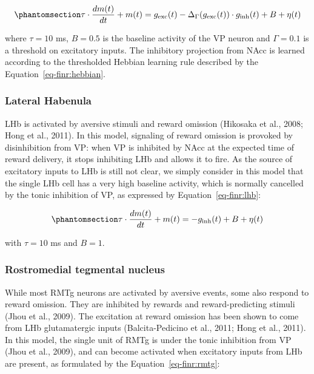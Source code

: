 \documentclass[
  11pt,
  a4paper,
]{scrbook}
\begin{document}
\begin{equation}\phantomsection\label{eq-finr:vp}{
    \tau \cdot \frac{dm(t)}{dt} +  m(t) = g_{\text{exc}}(t) - \Delta_{\Gamma} (g_{\text{exc}}(t)) \cdot g_{\text{inh}}(t) + B + \eta(t)
}\end{equation}

where \(\tau=10\) ms, \(B=0.5\) is the baseline activity of the VP
neuron and \(\Gamma=0.1\) is a threshold on excitatory inputs. The
inhibitory projection from NAcc is learned according to the thresholded
Hebbian learning rule described by the Equation~\ref{eq-finr:hebbian}.

\subsubsection*{Lateral Habenula}\label{lateral-habenula}

LHb is activated by aversive stimuli and reward omission (Hikosaka et
al., 2008; Hong et al., 2011). In this model, signaling of reward
omission is provoked by disinhibition from VP: when VP is inhibited by
NAcc at the expected time of reward delivery, it stops inhibiting LHb
and allows it to fire. As the source of excitatory inputs to LHb is
still not clear, we simply consider in this model that the single LHb
cell has a very high baseline activity, which is normally cancelled by
the tonic inhibition of VP, as expressed by Equation~\ref{eq-finr:lhb}:

\begin{equation}\phantomsection\label{eq-finr:lhb}{
    \tau \cdot \frac{dm(t)}{dt} +  m(t) = - g_{\text{inh}}(t) + B + \eta(t)
}\end{equation}

with \(\tau=10\) ms and \(B=1\).

\subsubsection*{Rostromedial tegmental
nucleus}\label{rostromedial-tegmental-nucleus}

While most RMTg neurons are activated by aversive events, some also
respond to reward omission. They are inhibited by rewards and
reward-predicting stimuli (Jhou et al., 2009). The excitation at reward
omission has been shown to come from LHb glutamatergic inputs
(Balcita-Pedicino et al., 2011; Hong et al., 2011). In this model, the
single unit of RMTg is under the tonic inhibition from VP (Jhou et al.,
2009), and can become activated when excitatory inputs from LHb are
present, as formulated by the Equation~\ref{eq-finr:rmtg}:
\end{document}
